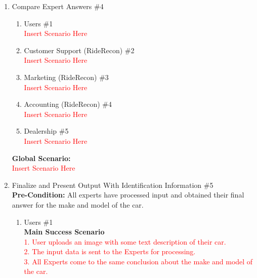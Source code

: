 \documentclass[]{article}
\begin{document}
\begin{enumerate}[label={\bf BE\arabic*.}]
\begin{enumerate}[label=\textbf{VP\arabic*.}]
				\textcolor{red}{Insert Scenario Here}
			\item Marketing (RideRecon) \#3 \\
				\textcolor{red}{Insert Scenario Here}
			\item Accounting (RideRecon) \#4 \\
				\textcolor{red}{Insert Scenario Here}
			\item Dealership \#5 \\
				\textcolor{red}{Insert Scenario Here}
		\end{enumerate}
		{\bf Global Scenario:}\\
		\textcolor{red}{Insert Scenario Here}
	\item Compare Expert Answers \#4
	\begin{enumerate}[label={\bf VP\arabic*.}]
		\item Users \#1 \\
			\textcolor{red}{Insert Scenario Here}
		\item Customer Support (RideRecon) \#2 \\
			\textcolor{red}{Insert Scenario Here}
		\item Marketing (RideRecon) \#3 \\
			\textcolor{red}{Insert Scenario Here}
		\item Accounting (RideRecon) \#4 \\
			\textcolor{red}{Insert Scenario Here}
		\item Dealership \#5 \\
			\textcolor{red}{Insert Scenario Here}
	\end{enumerate}
	{\bf Global Scenario:}\\
	\textcolor{red}{Insert Scenario Here}
	\item Finalize and Present Output With Identification Information \#5 \\
		\textbf{Pre-Condition:} All experts have processed input and obtained their final answer for the make and model of the car.
		\begin{enumerate}[label=\textbf{VP\arabic*.}]
			\item Users \#1 \\
				\textbf{Main Success Scenario} \\
				\textcolor{red}{1. User uploads an image with some text description of their car.} \\
				\textcolor{red}{2. The input data is sent to the Experts for processing.} \\
				\textcolor{red}{3. All Experts come to the same conclusion about the make and model of the car.} \\

\end{enumerate}
\end{enumerate}
\end{document}
